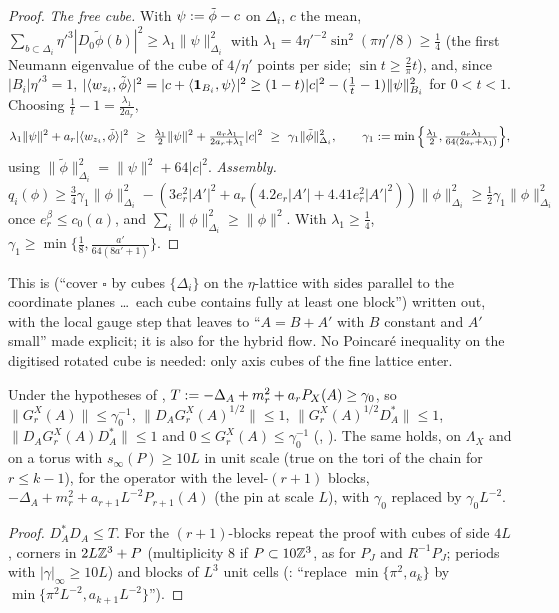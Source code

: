 \begin{proof}
\emph{The free cube.} With $\psi:=\tilde\phi-c$ on $\Delta_i$, $c$ the mean, $\sum_{b\subset\Delta_i}\eta'^3|D_0\tilde\phi(b)|^2\ge\lambda_1\|\psi\|^2_{\Delta_i}$ with $\lambda_1=4\eta'^{-2}\sin^2(\pi\eta'/8)\ge\frac14$ (the first Neumann eigenvalue of the cube of $4/\eta'$ points per side; $\sin t\ge\frac2\pi t$), and, since $|B_i|\eta'^3=1$, $|\langle w_{z_i},\tilde\phi\rangle|^2=|c+\langle \mathbf 1_{B_i},\psi\rangle|^2\ge(1-t)|c|^2-(\frac1t-1)\|\psi\|^2_{B_i}$ for $0<t<1$. Choosing $\frac1t-1=\frac{\lambda_1}{2a_r}$,
\[
\lambda_1\|\psi\|^2+a_r|\ip{w_{z_i}}{\tilde\phi}|^2\ \ge\ \tfrac{\lambda_1}2\|\psi\|^2+\tfrac{a_r\lambda_1}{2a_r+\lambda_1}|c|^2\ \ge\ \gamma_1\|\tilde\phi\|^2_{\Delta_i},\qquad
\gamma_1\defeq\min\Big\{\tfrac{\lambda_1}2,\tfrac{a_r\lambda_1}{64(2a_r+\lambda_1)}\Big\},
\]
using $\|\tilde\phi\|^2_{\Delta_i}=\|\psi\|^2+64|c|^2$. \emph{Assembly.} $q_i(\phi)\ge\frac34\gamma_1\|\phi\|^2_{\Delta_i}-(3e_r^2|A'|^2+a_r(4.2e_r|A'|+4.41e_r^2|A'|^2))\|\phi\|^2_{\Delta_i}\ge\frac12\gamma_1\|\phi\|^2_{\Delta_i}$ once $e_r^\beta\le c_0(a)$, and $\sum_i\|\phi\|^2_{\Delta_i}\ge\|\phi\|^2$. With $\lambda_1\ge\frac14$, $\gamma_1\ge\min\{\frac18,\frac{a'}{64(8a'+1)}\}$.
\end{proof}

This is \cite[(5.59)--(5.60)]{K2} (``cover $\square$ by cubes $\{\Delta_i\}$ on the $\eta$-lattice with sides parallel to the coordinate planes \dots\ each cube contains fully at least one block'') written out, with the local gauge step that \cite[p.~345]{K2} leaves to ``$A=B+A'$ with $B$ constant and $A'$ small'' made explicit; it is also \cite[(1.8)]{Ba4} for the hybrid flow. No Poincar\'e inequality on the digitised rotated cube is needed: only axis cubes of the fine lattice enter.

\begin{corollary}[$L^2$ bounds]\label{rot:hyb:cor:L2}
Under the hypotheses of , $T:=-\Delta_A+m_r^2+a_rP_X(A)\ge\gamma_0$, so $\|G^X_r(A)\|\le\gamma_0^{-1}$, $\|D_AG^X_r(A)^{1/2}\|\le1$, $\|G^X_r(A)^{1/2}D_A^*\|\le1$, $\|D_AG^X_r(A)D_A^*\|\le1$ and $0\le G^X_r(A)\le\gamma_0^{-1}$ (\cite[Lemma~2.1]{Ba4}, \cite[Lemma~5.7]{K2}). The same holds, on $\Lambda_X$ and on a torus with $s_\infty(P)\ge10L$ in unit scale (true on the tori of the chain for $r\le k-1$), for the operator with the level-$(r+1)$ blocks, $-\Delta_A+m_r^2+a_{r+1}L^{-2}P_{r+1}(A)$ (the pin at scale $L$), with $\gamma_0$ replaced by $\gamma_0L^{-2}$.
\end{corollary}
\begin{proof}
$D_A^*D_A\le T$. For the $(r+1)$-blocks repeat the proof with cubes of side $4L$, corners in $2L\mathbb Z^3+P$ (multiplicity $8$ if $P\subset10\mathbb Z^3$, as for $P_J$ and $R^{-1}P_J$; periods with $|\gamma|_\infty\ge10L$) and blocks of $L^3$ unit cells (\cite[p.~588]{Ba4}: ``replace $\min\{\pi^2,a_k\}$ by $\min\{\pi^2L^{-2},a_{k+1}L^{-2}\}$'').
\end{proof}

